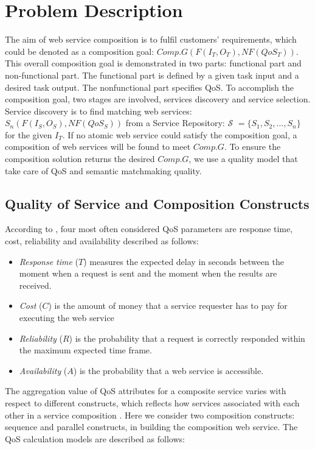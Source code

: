 \documentclass{IEEEtran}
\begin{document}
\section{Problem Description}\label{problemDes}

The aim of web service composition is to fulfil customers' requirements, which could be denoted as a composition goal: $Comp.G(F(I_{T}, O_{T}), NF(QoS_{T}))$. This overall composition goal is demonstrated in two parts: functional part and non-functional part. The functional part is defined by a given task input and a desired task output. The nonfunctional part specifies QoS. To accomplish the composition goal, two stages are involved, services discovery and service selection. Service discovery is to find matching web services: $S_{n}(F(I_{S}, O_{S}), NF(QoS_{S}))$ from a Service Repository: $\mathcal{S}$ $=  \{S_{1}, S_{2},..., S_{n} \}$ for the given $I_{T}$. If no atomic web service could satisfy the composition goal, a composition of web services will be found to meet $Comp.G$. To ensure the composition solution returns the desired $Comp.G$, we use a quality model that take care of QoS and semantic matchmaking quality.

\subsection{Quality of Service and Composition Constructs}\label{Quality of Service and Composition Constructs}
According to \cite{zeng2003quality}, four most often considered QoS parameters are response time, cost, reliability and availability described as follows:
\begin{itemize}
\item \textit{Response time} ($T$) measures the expected delay in seconds between the moment when a request is sent and the moment when the results are received.
\item \textit{Cost} ($C$) is the amount of money that a service requester has to pay for executing the web service
\item \textit{Reliability} ($R$) is the probability that a request is correctly responded within the maximum expected time frame.
\item \textit{Availability} ($A$) is the probability that a web service is accessible.
\end{itemize}
The aggregation value of QoS attributes for a composite service varies with respect to different constructs, which reflects how services associated with each other in a service composition \cite{zeng2003quality}. Here we consider two composition constructs: sequence and parallel constructs, in building the composition web service. The QoS calculation models are described as follows:
\end{document}
